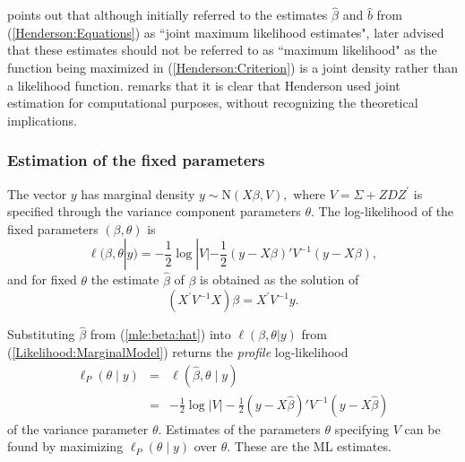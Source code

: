 \documentclass[12pt, a4paper]{report}
\theoremstyle{plain}
\theoremstyle{definition}
\theoremstyle{remark}
\begin{document}
		\cite{Robi:BLUP:1991} points out that although \cite{Henderson:1950} initially referred to the estimates $\hat{\beta}$ and $\hat{b}$ from (\ref{Henderson:Equations}) as ``joint maximum likelihood estimates", \cite{Henderson:1973} later advised that these estimates should not be referred to as ``maximum likelihood" as the function being maximized in (\ref{Henderson:Criterion}) is a joint density rather than a likelihood function. \cite{YLee} remarks that it is clear that Henderson used joint estimation for computational purposes, without recognizing the theoretical implications.
		
		
		

		
		


			\subsubsection{Estimation of the fixed parameters}
			
			The vector $y$ has marginal density $y \sim \mathrm{N}(X \beta,V),$ where $V = \Sigma + ZDZ^\prime$ is specified through the variance component parameters $\theta.$ The log-likelihood of the fixed parameters $(\beta, \theta)$ is
			\begin{equation}
			\ell (\beta, \theta|y) =
			-\frac{1}{2} \log |V| -\frac{1}{2}(y -
			X \beta)'V^{-1}(y -
			X \beta), \label{Likelihood:MarginalModel}
			\end{equation}
			and for fixed $\theta$ the estimate $\hat{\beta}$ of $\beta$ is obtained as the solution of
			\begin{equation}
			(X^\prime V^{-1}X) {\beta} = X^\prime V^{-1}y.
			\label{mle:beta:hat}
			\end{equation}
			
			Substituting $\hat{\beta}$ from (\ref{mle:beta:hat}) into $\ell(\beta, \theta|y)$ from (\ref{Likelihood:MarginalModel}) returns the \emph{profile} log-likelihood
			\begin{eqnarray*}
				\ell_P(\theta \mid y) &=& \ell(\hat{\beta}, \theta \mid y) \\
				&=& -\frac{1}{2} \log |V| -\frac{1}{2}(y - X \hat{\beta})'V^{-1}(y - X \hat{\beta})
			\end{eqnarray*}
			of the variance parameter $\theta.$ Estimates of the parameters $\theta$ specifying $V$ can be found by maximizing $\ell_P(\theta \mid y)$ over $\theta.$ These are the ML estimates.
			
\end{document}
